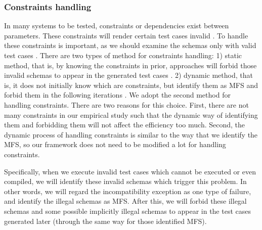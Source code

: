 \documentclass[journal,12pt,onecolumn,draftclsnofoot,]{IEEEtran}
\begin{document}

%

\subsubsection{Constraints handling}\label{sec:app:constriants handling}
In many systems to be tested, constraints or dependencies exist between parameters. These constraints will render certain test cases invalid \cite{cohen2008constructing}. To handle these constraints is important, as we should examine the schemas only with valid test cases \cite{yilmaz2013reducing}. There are two types of method for constraints handling: 1) static method, that is, by knowing the constraints in prior, approaches will forbid those invalid schemas to appear in the generated test cases \cite{cohen2007exploiting,cohen2008constructing,grindal2006handling,jin2014configurations,yu2015constraint}. 2) dynamic method, that is, it does not initially know which are constraints, but identify them as MFS and {\color{red}forbid} them in the following iterations \cite{yilmaz2013reducing}.  We adopt the second method for handling constraints.
There are two reasons for this choice. First, there are not many constraints in our empirical study such that the dynamic way of identifying them and forbidding them will not affect the efficiency too much.  Second, the dynamic process of handling constraints is similar to the way that we identify the MFS, so our framework does not need to be modified a lot for handling constraints.

Specifically, when we execute invalid test cases which cannot be executed or even compiled, we will identify these invalid schemas which trigger this problem. In other words, we will regard the incompatibility exception as one type of failure, and identify the illegal schemas as MFS. After this, we will forbid these illegal schemas and some possible implicitly illegal schemas to appear in the test cases generated later (through the same way for those identified MFS).
\end{document}
